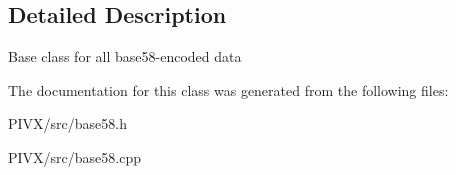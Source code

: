 \subsection{Detailed Description}
Base class for all base58-\/encoded data 

The documentation for this class was generated from the following files\+:\begin{DoxyCompactItemize}
\item 
P\+I\+V\+X/src/base58.\+h\item 
P\+I\+V\+X/src/base58.\+cpp\end{DoxyCompactItemize}
